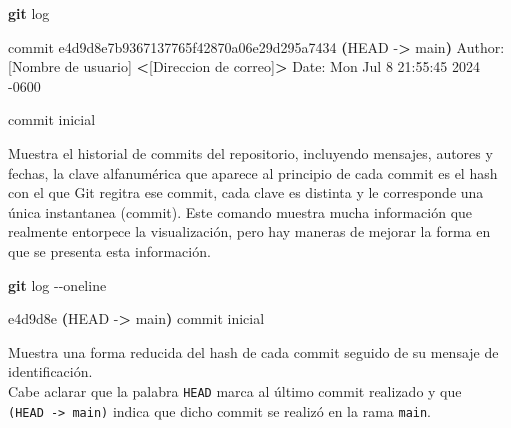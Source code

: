 \documentclass[
]{book}
\newenvironment{Shaded}{\begin{snugshade}}{\end{snugshade}}
\newcommand{\AttributeTok}[1]{\textcolor[rgb]{0.13,0.29,0.53}{#1}}
\newcommand{\ErrorTok}[1]{\textcolor[rgb]{0.64,0.00,0.00}{\textbf{#1}}}
\newcommand{\ExtensionTok}[1]{#1}
\newcommand{\FunctionTok}[1]{\textcolor[rgb]{0.13,0.29,0.53}{\textbf{#1}}}
\newcommand{\KeywordTok}[1]{\textcolor[rgb]{0.13,0.29,0.53}{\textbf{#1}}}
\newcommand{\NormalTok}[1]{#1}
\newcommand{\OperatorTok}[1]{\textcolor[rgb]{0.81,0.36,0.00}{\textbf{#1}}}
\begin{document}
\begin{Shaded}
\begin{Highlighting}[]
\FunctionTok{git}\NormalTok{ log}
\end{Highlighting}
\end{Shaded}

\begin{Shaded}
\begin{Highlighting}[]
\ExtensionTok{commit}\NormalTok{ e4d9d8e7b9367137765f42870a06e29d295a7434 }\ErrorTok{(}\ExtensionTok{HEAD} \AttributeTok{{-}}\OperatorTok{\textgreater{}}\NormalTok{ main}\KeywordTok{)}
\ExtensionTok{Author:}\NormalTok{ [Nombre de usuario] }\OperatorTok{\textless{}}\NormalTok{[Direccion de correo]}\OperatorTok{\textgreater{}}
\ExtensionTok{Date:}\NormalTok{   Mon Jul 8 21:55:45 2024 }\AttributeTok{{-}0600}

    \ExtensionTok{commit}\NormalTok{ inicial}
\end{Highlighting}
\end{Shaded}

Muestra el historial de commits del repositorio, incluyendo mensajes, autores y fechas, la clave alfanumérica que aparece al principio de cada commit es el hash con el que Git regitra ese commit, cada clave es distinta y le corresponde una única instantanea (commit).
Este comando muestra mucha información que realmente entorpece la visualización, pero hay maneras de mejorar la forma en que se presenta esta información.

\begin{Shaded}
\begin{Highlighting}[]
\FunctionTok{git}\NormalTok{ log }\AttributeTok{{-}{-}oneline}
\end{Highlighting}
\end{Shaded}

\begin{Shaded}
\begin{Highlighting}[]
\ExtensionTok{e4d9d8e} \ErrorTok{(}\ExtensionTok{HEAD} \AttributeTok{{-}}\OperatorTok{\textgreater{}}\NormalTok{ main}\KeywordTok{)} \ExtensionTok{commit}\NormalTok{ inicial}
\end{Highlighting}
\end{Shaded}

Muestra una forma reducida del hash de cada commit seguido de su mensaje de identificación.\\
Cabe aclarar que la palabra \texttt{HEAD} marca al último commit realizado y que \texttt{(HEAD\ -\textgreater{}\ main)} indica que dicho commit se realizó en la rama \texttt{main}.
\end{document}
